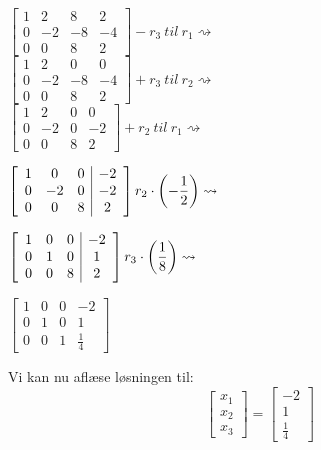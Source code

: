 \documentclass[a4paper,12pt]{article}
\begin{document}
$\left[\begin{array}{ccc|c}
    1 & 2 & 8 & 2 \\
    0 & -2 & -8 & -4 \\
    0 & 0 & 8 & 2
\end{array}\right]
-r_3 \ til \ r_1
\rightsquigarrow$\\

$\left[\begin{array}{ccc|c}
    1 & 2 & 0 & 0 \\
    0 & -2 & -8 & -4 \\
    0 & 0 & 8 & 2
\end{array}\right]
+r_3 \ til \ r_2
\rightsquigarrow$\\

$\left[\begin{array}{ccc|c}
    1 & 2 & 0 & 0 \\
    0 & -2 & 0 & -2 \\
    0 & 0 & 8 & 2
\end{array}\right]
+r_2 \ til \ r_1
\rightsquigarrow$

$\left[\begin{array}{ccc|c}
    1 & 0 & 0 & -2 \\
    0 & -2 & 0 & -2 \\
    0 & 0 & 8 & 2
\end{array}\right]
r_2 \cdot \left( -\dfrac{1}{2}\right)
\rightsquigarrow$

$\left[\begin{array}{ccc|c}
    1 & 0 & 0 & -2 \\
    0 & 1 & 0 & 1 \\
    0 & 0 & 8 & 2
\end{array}\right]
r_3 \cdot \left( \dfrac{1}{8}\right)
\rightsquigarrow$

$\left[\begin{array}{ccc|c}
    1 & 0 & 0 & -2 \\
    0 & 1 & 0 & 1 \\
    0 & 0 & 1 & \frac{1}{4}
\end{array}\right]$

Vi kan nu aflæse løsningen til:
\[
\left[\begin{array}{c}
    x_1\\
    x_2\\
    x_3
\end{array}\right]
=
\left[\begin{array}{c}
    -2\\
    1\\
    \frac{1}{4}
\end{array}\right]
\]
\end{document}
